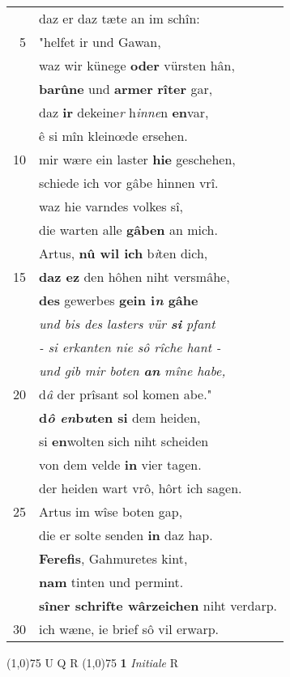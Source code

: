 \documentclass[8pt,a4paper,notitlepage]{article}
\begin{document}
\begin{table}[ht]
\begin{minipage}[t]{0.5\linewidth}
\begin{tabular}{rl}
 & daz er daz tæte an im schîn:\\ 
5 & "helfet ir und Gawan,\\ 
 & waz wir künege \textbf{oder} vürsten hân,\\ 
 & \textbf{barûne} und \textbf{armer} \textbf{rîter} gar,\\ 
 & daz \textbf{ir} dekeine\textit{r} h\textit{inne}n \textbf{en}var,\\ 
 & ê si mîn kleinœde ersehen.\\ 
10 & mir wære ein laster \textbf{hie} geschehen,\\ 
 & schiede ich vor gâbe hinnen vrî.\\ 
 & waz hie varndes volkes sî,\\ 
 & die warten alle \textbf{gâben} an mich.\\ 
 & Artus, \textbf{nû wil ich} b\textit{i}ten dich,\\ 
15 & \textbf{daz ez} den hôhen niht versmâhe,\\ 
 & \textbf{des} gewerbes \textbf{gein i\textit{n} gâhe}\\ 
 & \textit{und bis des lasters vür \textbf{si} pfant}\\ 
 & \textit{- si erkanten nie sô rîche hant -}\\ 
 & \textit{und gib mir boten \textbf{an} mîne habe,}\\ 
20 & d\textit{â} der prîsant sol komen abe."\\ 
 & \textbf{d\textit{ô en}b\textit{u}ten si} dem heiden,\\ 
 & si \textbf{en}wolten sich niht scheiden\\ 
 & von dem velde \textbf{in} vier tagen.\\ 
 & der heiden wart vrô, hôrt ich sagen.\\ 
25 & Artus im wîse boten gap,\\ 
 & die er solte senden \textbf{in} daz hap.\\ 
 & \textbf{Ferefis}, Gahmuretes kint,\\ 
 & \textbf{nam} tinten und permint.\\ 
 & \textbf{sîner schrifte wârzeichen} niht verdarp.\\ 
30 & ich wæne, ie brief sô vil erwarp.\\ 
\end{tabular}
\scriptsize
\line(1,0){75} \newline
U Q R \newline
\line(1,0){75} \newline
\textbf{1} \textit{Initiale} R  \newline

\end{minipage}
\end{table}
\end{document}
